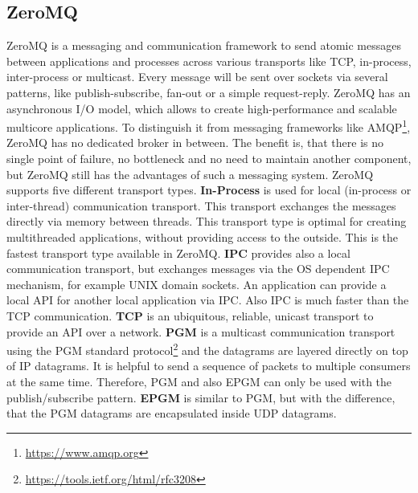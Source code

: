 \subsection{ZeroMQ}
\label{section:ZeroMQ}
ZeroMQ is a messaging and communication framework to send atomic messages between applications and processes across various transports like \ac{TCP}, in-process, inter-process or multicast.\autocite[cf.]{ZeroMQ:Guide}
Every message will be sent over sockets via several patterns, like publish-subscribe, fan-out or a simple request-reply.\autocite[cf.]{ZeroMQ:Guide}
ZeroMQ has an asynchronous I/O model, which allows to create high-performance and scalable multicore applications.\autocite[cf.]{ZeroMQ:Guide}
To distinguish it from messaging frameworks like \ac{AMQP}\footnote{\url{https://www.amqp.org}}, ZeroMQ has no dedicated broker in between.
The benefit is, that there is no single point of failure, no bottleneck and no need to maintain another component, but ZeroMQ still has the advantages of such a messaging system.
ZeroMQ supports five different transport types.\newline\newline
\textbf{In-Process} is used for local (in-process or inter-thread) communication transport.
This transport exchanges the messages directly via memory between threads.\autocite[cf.]{ZeroMQ:inproc}
This transport type is optimal for creating multithreaded applications, without providing access to the outside.
This is the fastest transport type available in ZeroMQ.\newline\newline
\textbf{\ac{IPC}} provides also a local communication transport, but exchanges messages via the \ac{OS} dependent \ac{IPC} mechanism, for example UNIX domain sockets.
An application can provide a local \ac{API} for another local application via \ac{IPC}.
Also \ac{IPC} is much faster than the \ac{TCP} communication.\newline\newline
\textbf{\ac{TCP}} is an ubiquitous, reliable, unicast transport to provide an \ac{API} over a network.\autocite[cf.]{ZeroMQ:tcp}
\newpage %
\textbf{\ac{PGM}} is a multicast communication transport using the \ac{PGM} standard protocol\footnote{\url{https://tools.ietf.org/html/rfc3208}} and the datagrams are layered directly on top of IP datagrams.\autocite[cf.]{ZeroMQ:pgm}
It is helpful to send a sequence of packets to multiple consumers at the same time.
Therefore, \ac{PGM} and also \acs{EPGM} can only be used with the publish/subscribe pattern.\newline
\textbf{\ac{EPGM}} is similar to \ac{PGM}, but with the difference, that the PGM datagrams are encapsulated inside UDP datagrams.\autocite[cf.]{ZeroMQ:pgm}

